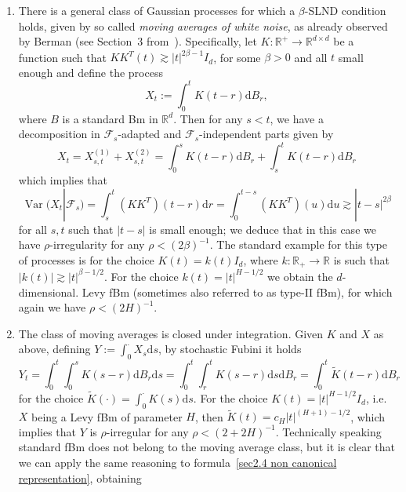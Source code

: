 \documentclass[10pt]{article}
\newcommand{\assign}{:=}
\newcommand{\mathd}{\mathrm{d}}
\newcommand{\nobracket}{}
\newcommand{\tmem}[1]{{\em #1\/}}
\newcommand{\tmop}[1]{\ensuremath{\operatorname{#1}}}
\begin{document}
\begin{enumerate}[label=\roman*.]
    \item There is a general class of Gaussian processes for which a
    $\beta$\mbox{-}SLND condition holds, given by so called {\tmem{moving
    averages of white noise}}, as already observed by Berman (see Section~3
    from~{\cite{berman73}}). Specifically, let $K : \mathbb{R}^+ \rightarrow
    \mathbb{R}^{d \times d}$ be a function such that $K K^T (t) \gtrsim | t
    |^{2 \beta - 1} I_d$, for some $\beta > 0$ and all $t$ small enough and
    define the process
    \[ X_t \assign \int_0^t K (t - r) \mathd B_r, \]
    where $B$ is a standard Bm in $\mathbb{R}^d$. Then for any $s < t$, we
    have a decomposition in $\mathcal{F}_s$-adapted and
    $\mathcal{F}_s$-independent parts given by
    \[ X_t = X_{s, t}^{(1)} + X_{s, t}^{(2)} = \int_0^s K (t - r) \mathd B_r +
       \int_s^t K (t - r) \mathd B_r \]
    which implies that
    \[ \tmop{Var} (X_t | \mathcal{F}_s \nobracket) = \int_s^t (K K^T) (t - r)
       \mathd r = \int_0^{t - s} (K K^T) (u) \mathd u \gtrsim | t - s |^{2
       \beta} \]
    for all $s, t$ such that $| t - s |$ is small enough; we deduce that in
    this case we have $\rho$\mbox{-}irregularity for any $\rho < (2 \beta)^{-
    1}$. The standard example for this type of processes is for the choice $K
    (t) = k (t) I_d$, where $k : \mathbb{R}_+ \rightarrow \mathbb{R}$ is such
    that $| k (t) | \gtrsim | t |^{\beta - 1 / 2}$. For the choice $k (t) = |
    t |^{H - 1 / 2}$ we obtain the $d$-dimensional. Levy fBm (sometimes also referred
    to as type\mbox{-}II fBm), for which again we have $\rho < (2 H)^{- 1}$.
    
    \item The class of moving averages is closed under integration. Given $K$
    and $X$ as above, defining $Y \assign \int_0^{\cdot} X_s \mathd s$, by
    stochastic Fubini it holds
    \[ Y_t = \int_0^t \int_0^s K (s - r) \mathd B_r \mathd s = \int_0^t
       \int_r^t K (s - r) \mathd s \mathd B_r = \int_0^t \tilde{K} (t - r)
       \mathd B_r \]
    for the choice $\tilde{K} (\cdot) = \int_0^{\cdot} K (s) \mathd s$. For
    the choice $K (t) = | t |^{H - 1 / 2} I_d$, i.e. $X$ being a Levy fBm of
    parameter $H$, then $\tilde{K} (t) = c_H | t |^{(H + 1) - 1 / 2}$, which
    implies that $Y$ is $\rho$\mbox{-}irregular for any $\rho < (2 + 2 H)^{-
    1}$. Technically speaking standard fBm does not belong to the moving
    average class, but it is clear that we can apply the same reasoning to
    formula~\eqref{sec2.4 non canonical representation}, obtaining
    

\end{enumerate}
\end{document}
